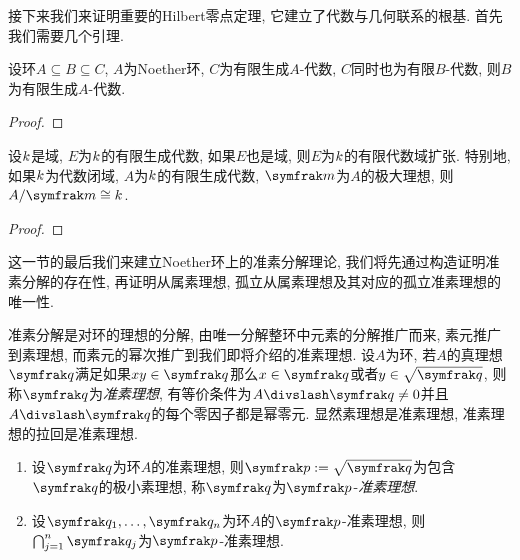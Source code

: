 接下来我们来证明重要的Hilbert零点定理, 它建立了代数与几何联系的根基. 首先我们需要几个引理.

\begin{proposition}
    设环$A\subseteq B\subseteq C$, $A$为Noether环, $C$为有限生成$A$-代数, $C$同时也为有限$B$-代数, 则$B$为有限生成$A$-代数.
\end{proposition}

\begin{proof}

\end{proof}

\begin{theorem}
    设$k$是域, $E$为$k$的有限生成代数, 如果$E$也是域, 则$E$为$k$的有限代数域扩张. 特别地, 如果$k$为代数闭域, $A$为$k$的有限生成代数, $\ideal{m}$为$A$的极大理想, 则$A/\ideal{m}\cong \field{k}$.
\end{theorem}

\begin{proof}
\end{proof}

这一节的最后我们来建立Noether环上的准素分解理论, 我们将先通过构造证明准素分解的存在性, 再证明从属素理想, 孤立从属素理想及其对应的孤立准素理想的唯一性.

准素分解是对环的理想的分解, 由唯一分解整环中元素的分解推广而来, 素元推广到素理想, 而素元的幂次推广到我们即将介绍的准素理想. 设$A$为环, 若$A$的真理想$\ideal{q}$满足如果$xy\in \ideal{q}$那么$x\in\ideal{q}$或者$y\in\sqrt{\ideal{q}}$, 则称$\ideal{q}$为\emph{准素理想}, 有等价条件为$A{\divslash}\ideal{q}\neq 0$并且$A{\divslash}\ideal{q}$的每个零因子都是幂零元. 显然素理想是准素理想, 准素理想的拉回是准素理想.

\begin{proposition}\label{prop:primary}\leavevmode
    \begin{enumerate}
        \item 设$\ideal{q}$为环$A$的准素理想, 则$\ideal{p}:=\sqrt{\ideal{q}}$为包含$\ideal{q}$的极小素理想, 称$\ideal{q}$为$\ideal{p}$-\emph{准素理想}.
        \item\label{enum:prim-inte} 设$\ideal{q}_1, \dotsc, \ideal{q}_n$为环$A$的$\ideal{p}$-准素理想, 则$\bigcap_{j=1}^n\ideal{q}_j$为$\ideal{p}$-准素理想.
    \end{enumerate}
\end{proposition}

